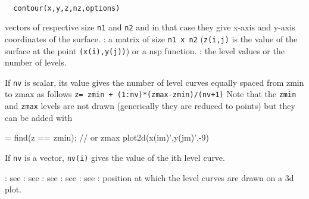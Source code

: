 
\begin{mandesc}
  \\ %
\end{mandesc}
\begin{calling_sequence}
\begin{verbatim}
  contour(x,y,z,nz,options)
\end{verbatim}
\end{calling_sequence}

\begin{parameters}
  \begin{varlist}
     vectors of respective size \verb!n1! and \verb!n2! and in that case they give x-axis
    and y-axis coordinates of the surface.
    :  a matrix of size \verb!n1 x n2! (\verb!z(i,j)! is the
    value of the surface at the point \verb!(x(i),y(j))!) or a nsp function.
    : the level values or the number of levels.
    \begin{varlist}
      \vname{-}If \verb!nv! is scalar, its value gives the
      number of level curves equally spaced from zmin to zmax as
      follows \verb!z= zmin + (1:nv)*(zmax-zmin)/(nv+1)!
      Note that the \verb!zmin! and \verb!zmax!
      levels are not drawn (generically they are reduced to points)
      but they can be added with
      \begin{nspcode}
        [im,jm] = find(z == zmin); // or zmax
        plot2d(x(im)',y(jm)',-9)
      \end{nspcode}
      \vname{-}If \verb!nv! is a vector, \verb!nv(i)! gives
      the value of the ith level curve.
    \end{varlist}
    : see 
    : see 
    : see 
    : see 
    : see 
    : position at which the level curves are drawn on a 3d plot.
  \end{varlist}
\end{parameters}

